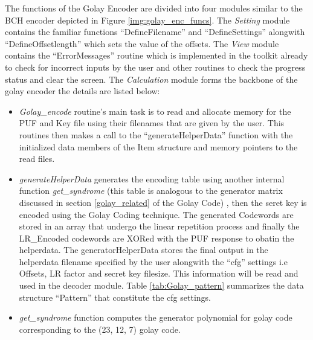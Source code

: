 	The functions of the Golay Encoder are divided into four modules similar to the BCH encoder depicted in Figure \ref{img:golay_enc_funcs}. The \emph{Setting} module contains the familiar functions ``DefineFilename'' and ``DefineSettings'' alongwith ``DefineOffsetlength'' which sets the value of the offsets. The \emph{View} module contains the ``ErrorMessages'' routine which is implemented in the toolkit already to check for incorrect inputs by the user and other routines to check the progress status and
	clear the screen. The \emph{Calculation} module forms the backbone of the golay encoder the details are listed below:

	\begin{itemize}
		\item \emph{Golay\_encode} routine's main task is to read and allocate memory for the PUF and Key file using their filenames that are given by the user. This routines then makes a call to the ``generateHelperData'' function with the initialized data members of the Item structure and memory pointers to the read files.
		\item \emph{generateHelperData} generates the encoding table using another internal function \emph{get\_syndrome} (this table is analogous to the generator matrix discussed in section \ref{golay_related} of the Golay Code) , then the seret key is encoded using the Golay Coding technique. The generated Codewords are stored in an array that undergo the linear repetition process and finally the LR\_Encoded codewords are XORed with the PUF response to obatin the
			helperdata. The generatorHelperData stores the final output in the helperdata filename specified by the user alongwith the ``cfg'' settings i.e Offsets, LR factor and secret key filesize. This information will be read and used in the decoder module. Table \ref{tab:Golay_pattern} summarizes the data structure ``Pattern'' that constitute the cfg settings.

		\item \emph{get\_syndrome} function computes the generator polynomial for golay code corresponding to the (23, 12, 7) golay code. \end{itemize}

